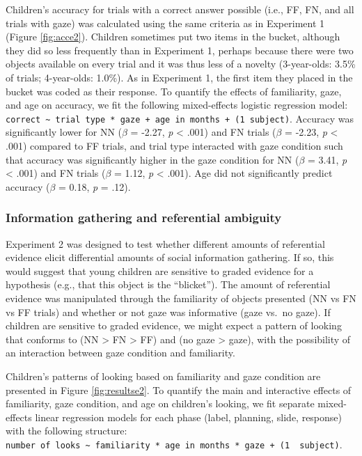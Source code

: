 \documentclass[english,man]{apa6}
\theoremstyle{definition}
\theoremstyle{definition}
\theoremstyle{definition}
\theoremstyle{remark}
\begin{document}
Children's accuracy for trials with a correct answer possible (i.e., FF,
FN, and all trials with gaze) was calculated using the same criteria as
in Experiment 1 (Figure \ref{fig:acce2}). Children sometimes put two
items in the bucket, although they did so less frequently than in
Experiment 1, perhaps because there were two objects available on every
trial and it was thus less of a novelty (3-year-olds: 3.5\% of trials;
4-year-olds: 1.0\%). As in Experiment 1, the first item they placed in
the bucket was coded as their response. To quantify the effects of
familiarity, gaze, and age on accuracy, we fit the following
mixed-effects logistic regression model:
\texttt{correct\ \textasciitilde{}\ trial\ type\ *\ gaze\ +\ age\ in\ months\ +\ (1\textbar{}\ subject)}.
Accuracy was significantly lower for NN (\(\beta\) = -2.27, \emph{p}
\textless{} .001) and FN trials (\(\beta\) = -2.23, \emph{p} \textless{}
.001) compared to FF trials, and trial type interacted with gaze
condition such that accuracy was significantly higher in the gaze
condition for NN (\(\beta\) = 3.41, \emph{p} \textless{} .001) and FN
trials (\(\beta\) = 1.12, \emph{p} \textless{} .001). Age did not
significantly predict accuracy (\(\beta\) = 0.18, \emph{p} = .12).

\subsubsection{Information gathering and referential
ambiguity}\label{information-gathering-and-referential-ambiguity}

Experiment 2 was designed to test whether different amounts of
referential evidence elicit differential amounts of social information
gathering. If so, this would suggest that young children are sensitive
to graded evidence for a hypothesis (e.g., that this object is the
\enquote{blicket}). The amount of referential evidence was manipulated
through the familiarity of objects presented (NN vs FN vs FF trials) and
whether or not gaze was informative (gaze vs.~no gaze). If children are
sensitive to graded evidence, we might expect a pattern of looking that
conforms to (NN \textgreater{} FN \textgreater{} FF) and (no gaze
\textgreater{} gaze), with the possibility of an interaction between
gaze condition and familiarity.

Children's patterns of looking based on familiarity and gaze condition
are presented in Figure \ref{fig:resultse2}. To quantify the main and
interactive effects of familiarity, gaze condition, and age on
children's looking, we fit separate mixed-effects linear regression
models for each phase (label, planning, slide, response) with the
following structure:
\texttt{number\ of\ looks\ \textasciitilde{}\ familiarity\ *\ age\ in\ months\ *\ gaze\ +\ (1\ \textbar{}\ subject)}.
\end{document}
